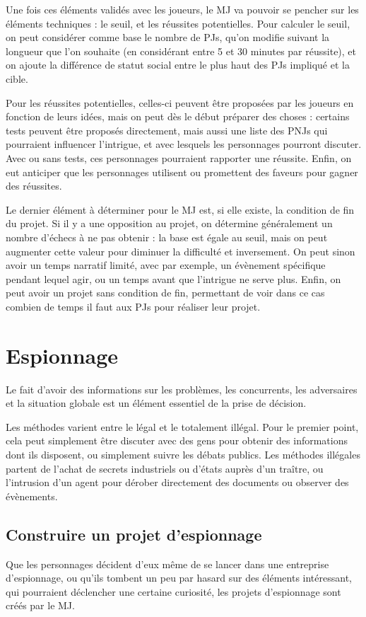 \documentclass[10pt,a4paper]{book}
\begin{document}
\begin{multicols}{2}
Une fois ces éléments validés avec les joueurs, le MJ va pouvoir se pencher sur les éléments techniques : le seuil, et les réussites potentielles. Pour calculer le seuil, on peut considérer comme base le nombre de PJs, qu'on modifie suivant la longueur que l'on souhaite (en considérant entre 5 et 30 minutes par réussite), et on ajoute la différence de statut social entre le plus haut des PJs impliqué et la cible. 

Pour les réussites potentielles, celles-ci peuvent être proposées par les joueurs en fonction de leurs idées, mais on peut dès le début préparer des choses : certains tests peuvent être proposés directement, mais aussi une liste des PNJs qui pourraient influencer  l'intrigue, et avec lesquels les personnages pourront discuter. Avec ou sans tests, ces personnages pourraient rapporter une réussite. Enfin, on eut anticiper que les personnages utilisent ou promettent des faveurs pour gagner des réussites.

Le dernier élément à déterminer pour le MJ est, si elle existe, la condition de fin du projet. Si il y a une opposition au projet, on détermine généralement un nombre d'échecs à ne pas obtenir : la base est égale au seuil, mais on peut augmenter cette valeur pour diminuer la difficulté et inversement. On peut sinon avoir un temps narratif limité, avec par exemple, un évènement spécifique pendant lequel agir, ou un temps avant que l'intrigue ne serve plus. Enfin, on peut avoir un projet sans condition de fin, permettant de voir dans ce cas combien de temps il faut aux PJs pour réaliser leur projet.



\section{Espionnage}
Le fait d'avoir des informations sur les problèmes, les concurrents, les adversaires et la situation globale est un élément essentiel de la prise de décision. 

Les méthodes varient entre le légal et le totalement illégal. Pour le premier point, cela peut simplement être discuter avec des gens pour obtenir des informations dont ils disposent, ou simplement suivre les débats publics. Les méthodes illégales partent de l'achat de secrets industriels ou d'états auprès d'un traître, ou l'intrusion d'un agent pour dérober directement des documents ou observer des évènements.
\subsection{Construire un projet d'espionnage}
Que les personnages décident d'eux même de se lancer dans une entreprise d'espionnage, ou qu'ils tombent un peu par hasard sur des éléments intéressant, qui pourraient déclencher une certaine curiosité, les projets d'espionnage sont créés par le MJ.


\end{multicols}
\end{document}
